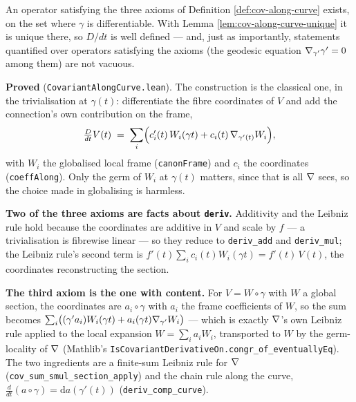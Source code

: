 \begin{lemma}[Existence of $D/dt$]
  \label{lem:cov-along-curve-exists}
  \leanok
  An operator satisfying the three axioms of Definition \ref{def:cov-along-curve}
  exists, on the set where $\gamma$ is differentiable. With Lemma
  \ref{lem:cov-along-curve-unique} it is unique there, so $D/dt$ is well
  defined --- and, just as importantly, statements quantified over operators
  satisfying the axioms (the geodesic equation $\nabla_{\gamma'}\gamma' = 0$
  among them) are not vacuous.

  \textbf{Proved} (\texttt{CovariantAlongCurve.lean}). The construction is the
  classical one, in the trivialisation at $\gamma(t)$: differentiate the fibre
  coordinates of $V$ and add the connection's own contribution on the frame,
  \[
    \tfrac{D}{dt}V(t) \;=\; \sum_i \Bigl( c_i'(t)\, W_i(\gamma t)
      + c_i(t)\, \nabla_{\gamma'(t)}W_i \Bigr),
  \]
  with $W_i$ the globalised local frame (\texttt{canonFrame}) and $c_i$ the
  coordinates (\texttt{coeffAlong}). Only the germ of $W_i$ at $\gamma(t)$
  matters, since that is all $\nabla$ sees, so the choice made in globalising is
  harmless.

  \textbf{Two of the three axioms are facts about \texttt{deriv}.} Additivity
  and the Leibniz rule hold because the coordinates are additive in $V$ and
  scale by $f$ --- a trivialisation is fibrewise linear --- so they reduce to
  \texttt{deriv\_add} and \texttt{deriv\_mul}; the Leibniz rule's second term
  is $f'(t)\sum_i c_i(t)W_i(\gamma t) = f'(t)\,V(t)$, the coordinates
  reconstructing the section.

  \textbf{The third axiom is the one with content.} For $V = W\circ\gamma$ with
  $W$ a global section, the coordinates are $a_i \circ \gamma$ with $a_i$ the
  frame coefficients of $W$, so the sum becomes
  $\sum_i\bigl((\gamma' a_i)W_i(\gamma t) + a_i(\gamma t)\nabla_{\gamma'}W_i\bigr)$
  --- which is exactly $\nabla$'s own Leibniz rule applied to the local expansion
  $W = \sum_i a_i W_i$, transported to $W$ by the germ-locality of $\nabla$
  (Mathlib's \texttt{IsCovariantDerivativeOn.congr\_of\_eventuallyEq}). The two
  ingredients are a finite-sum Leibniz rule for $\nabla$
  (\texttt{cov\_sum\_smul\_section\_apply}) and the chain rule along the curve,
  $\frac{d}{dt}(a\circ\gamma) = \mathrm{d}a(\gamma'(t))$
  (\texttt{deriv\_comp\_curve}).
\end{lemma}

